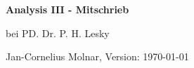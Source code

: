 \documentclass[paper=a5,parskip=half,fleqn,DIV=calc]{scrartcl}
\theoremstyle{graymarginwithblueheader}
\theoremstyle{graymarginwithyellowheader}
\theoremstyle{graymarginwithitblackheader}
\theoremstyle{graymarginwithblueheadern}
\theoremstyle{graymarginwithyellowheadern}
\theoremstyle{graymarginwithitblackheadern}
\begin{document}
\begin{center}
{\huge\bf Analysis III - Mitschrieb}

bei PD. Dr. P. H. Lesky

Jan-Cornelius Molnar, Version: \today\ \thistime
\end{center}

\tableofcontents

\newpage


\newpage


\newpage


\newpage


\end{document}

